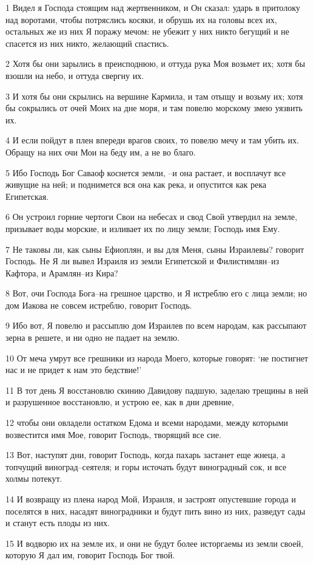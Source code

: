\par 1 Видел я Господа стоящим над жертвенником, и Он сказал: ударь в притолоку над воротами, чтобы потряслись косяки, и обрушь их на головы всех их, остальных же из них Я поражу мечом: не убежит у них никто бегущий и не спасется из них никто, желающий спастись.
\par 2 Хотя бы они зарылись в преисподнюю, и оттуда рука Моя возьмет их; хотя бы взошли на небо, и оттуда свергну их.
\par 3 И хотя бы они скрылись на вершине Кармила, и там отыщу и возьму их; хотя бы сокрылись от очей Моих на дне моря, и там повелю морскому змею уязвить их.
\par 4 И если пойдут в плен впереди врагов своих, то повелю мечу и там убить их. Обращу на них очи Мои на беду им, а не во благо.
\par 5 Ибо Господь Бог Саваоф коснется земли, --и она растает, и восплачут все живущие на ней; и поднимется вся она как река, и опустится как река Египетская.
\par 6 Он устроил горние чертоги Свои на небесах и свод Свой утвердил на земле, призывает воды морские, и изливает их по лицу земли; Господь имя Ему.
\par 7 Не таковы ли, как сыны Ефиоплян, и вы для Меня, сыны Израилевы? говорит Господь. Не Я ли вывел Израиля из земли Египетской и Филистимлян--из Кафтора, и Арамлян--из Кира?
\par 8 Вот, очи Господа Бога--на грешное царство, и Я истреблю его с лица земли; но дом Иакова не совсем истреблю, говорит Господь.
\par 9 Ибо вот, Я повелю и рассыплю дом Израилев по всем народам, как рассыпают зерна в решете, и ни одно не падает на землю.
\par 10 От меча умрут все грешники из народа Моего, которые говорят: `не постигнет нас и не придет к нам это бедствие!'
\par 11 В тот день Я восстановлю скинию Давидову падшую, заделаю трещины в ней и разрушенное восстановлю, и устрою ее, как в дни древние,
\par 12 чтобы они овладели остатком Едома и всеми народами, между которыми возвестится имя Мое, говорит Господь, творящий все сие.
\par 13 Вот, наступят дни, говорит Господь, когда пахарь застанет еще жнеца, а топчущий виноград--сеятеля; и горы источать будут виноградный сок, и все холмы потекут.
\par 14 И возвращу из плена народ Мой, Израиля, и застроят опустевшие города и поселятся в них, насадят виноградники и будут пить вино из них, разведут сады и станут есть плоды из них.
\par 15 И водворю их на земле их, и они не будут более исторгаемы из земли своей, которую Я дал им, говорит Господь Бог твой.


